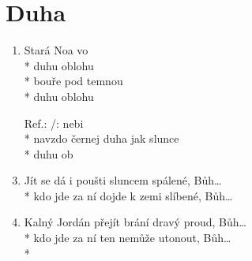 \section{Duha}
\begin{enumerate}
\item Stará   Noa  vo \\*
 duhu  oblohu   \\*
bouře  pod temnou  \\*
 duhu  oblohu  
\item[Ref.:] /:   nebi  \\*
navzdo černej  duha  jak slunce  \\*
 duhu ob  
\item Jít se dá i poušti sluncem spálené, Bůh… \\*
kdo jde za ní dojde k zemi slíbené, Bůh… 
\item Kalný Jordán přejít brání dravý proud, Bůh… \\*
kdo jde za ní ten nemůže utonout, Bůh… \\*
\end{enumerate}
